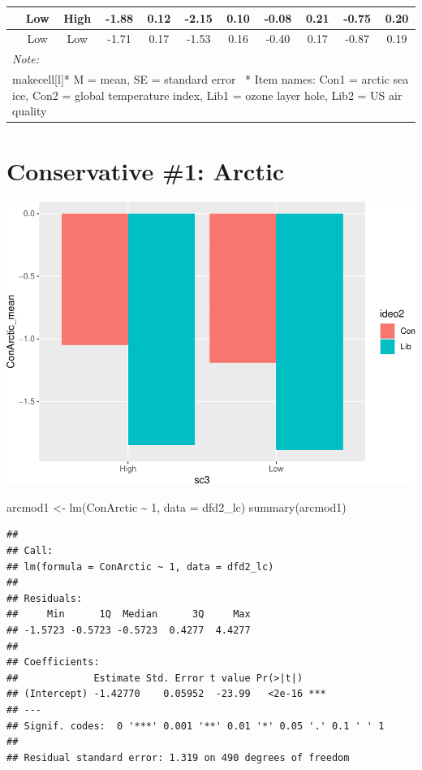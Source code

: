 \documentclass[
]{article}
\newenvironment{Shaded}{\begin{snugshade}}{\end{snugshade}}
\newcommand{\AttributeTok}[1]{\textcolor[rgb]{0.77,0.63,0.00}{#1}}
\newcommand{\DecValTok}[1]{\textcolor[rgb]{0.00,0.00,0.81}{#1}}
\newcommand{\FunctionTok}[1]{\textcolor[rgb]{0.00,0.00,0.00}{#1}}
\newcommand{\NormalTok}[1]{#1}
\newcommand{\OtherTok}[1]{\textcolor[rgb]{0.56,0.35,0.01}{#1}}
\newcommand{\SpecialCharTok}[1]{\textcolor[rgb]{0.00,0.00,0.00}{#1}}
\begin{document}
\begin{tabular}{>{}c|c|>{}c||c|>{}c||c|>{}c||c|>{}c||c|c}
\hline
\cellcolor{royalblue}{\textcolor{white}{\textbf{Lib}}} & Low & High & -1.88 & 0.12 & -2.15 & 0.10 & -0.08 & 0.21 & -0.75 & 0.20\\
\hline
\cellcolor{royalblue}{\textcolor{white}{\textbf{Lib}}} & Low & Low & -1.71 & 0.17 & -1.53 & 0.16 & -0.40 & 0.17 & -0.87 & 0.19\\
\hline
\multicolumn{11}{l}{\rule{0pt}{1em}\textit{Note: }}\\
\multicolumn{11}{l}{\rule{0pt}{1em}makecell[l]{* M = mean, SE = standard error \ * Item names: Con1 = arctic sea ice, Con2 = global temperature index, Lib1 = ozone layer hole, Lib2 = US air quality}}\\
\end{tabular}

\hypertarget{conservative-1-arctic}{%
\section{Conservative \#1: Arctic}\label{conservative-1-arctic}}

\includegraphics{desc0829_files/figure-latex/unnamed-chunk-1-1.pdf}

\begin{Shaded}
\begin{Highlighting}[]
\NormalTok{arcmod1 }\OtherTok{\textless{}{-}} \FunctionTok{lm}\NormalTok{(ConArctic }\SpecialCharTok{\textasciitilde{}} \DecValTok{1}\NormalTok{, }\AttributeTok{data =}\NormalTok{ dfd2\_lc)}
\FunctionTok{summary}\NormalTok{(arcmod1)}
\end{Highlighting}
\end{Shaded}

\begin{verbatim}
## 
## Call:
## lm(formula = ConArctic ~ 1, data = dfd2_lc)
## 
## Residuals:
##     Min      1Q  Median      3Q     Max 
## -1.5723 -0.5723 -0.5723  0.4277  4.4277 
## 
## Coefficients:
##             Estimate Std. Error t value Pr(>|t|)    
## (Intercept) -1.42770    0.05952  -23.99   <2e-16 ***
## ---
## Signif. codes:  0 '***' 0.001 '**' 0.01 '*' 0.05 '.' 0.1 ' ' 1
## 
## Residual standard error: 1.319 on 490 degrees of freedom
\end{verbatim}
\end{document}

